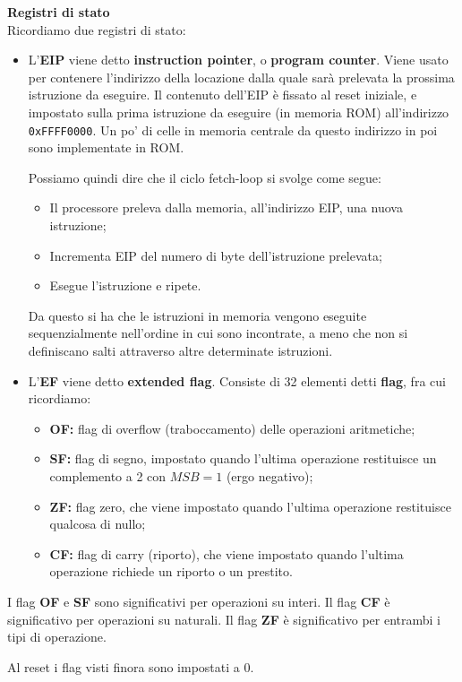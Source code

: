 \documentclass[a4paper,11pt]{article}
\begin{document}
\par\medskip
\noindent
\textbf{\textsf{Registri di stato}} \\
Ricordiamo due registri di stato:
\begin{itemize}
	\item  L'\textbf{EIP} viene detto \textbf{instruction pointer}, o \textbf{program counter}.
Viene usato per contenere l'indirizzo della locazione dalla quale sarà prelevata la prossima istruzione da eseguire.
Il contenuto dell'EIP è fissato al reset iniziale, e impostato sulla prima istruzione da eseguire (in memoria ROM) all'indirizzo \texttt{0xFFFF0000}.
Un po' di celle in memoria centrale da questo indirizzo in poi sono implementate in ROM.

Possiamo quindi dire che il ciclo fetch-loop si svolge come segue:
\begin{itemize}
	\item Il processore preleva dalla memoria, all'indirizzo EIP, una nuova istruzione;
	\item Incrementa EIP del numero di byte dell'istruzione prelevata;
	\item Esegue l'istruzione e ripete.
\end{itemize}

Da questo si ha che le istruzioni in memoria vengono eseguite sequenzialmente nell'ordine in cui sono incontrate, a meno che non si definiscano salti attraverso altre determinate istruzioni.
	
\item L'\textbf{EF} viene detto \textbf{extended flag}.
Consiste di 32 elementi detti \textbf{flag}, fra cui ricordiamo:
\begin{itemize}
	\item \textbf{OF:} flag di overflow (traboccamento) delle operazioni aritmetiche;
	\item \textbf{SF:} flag di segno, impostato quando l'ultima operazione restituisce un complemento a 2 con $MSB = 1$ (ergo negativo);
	\item \textbf{ZF:} flag zero, che viene impostato quando l'ultima operazione restituisce qualcosa di nullo;
	\item \textbf{CF:} flag di carry (riporto), che viene impostato quando l'ultima operazione richiede un riporto o un prestito.
\end{itemize}

\end{itemize}

I flag \textbf{OF} e \textbf{SF} sono significativi per operazioni su interi.
Il flag \textbf{CF} è significativo per operazioni su naturali.
Il flag \textbf{ZF} è significativo per entrambi i tipi di operazione.

Al reset i flag visti finora sono impostati a 0.
\end{document}
